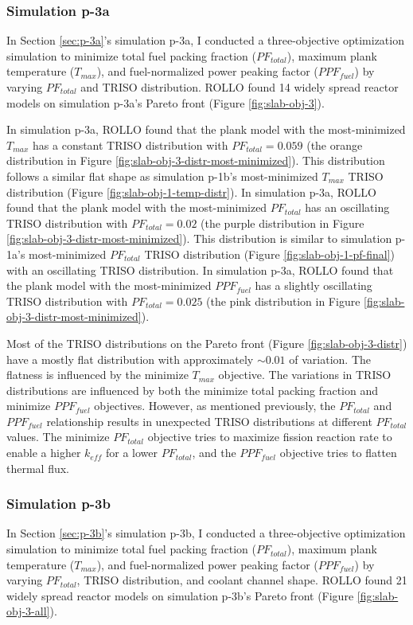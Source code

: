 \subsubsection{Simulation p-3a}
In Section \ref{sec:p-3a}'s simulation p-3a, I conducted a three-objective 
optimization simulation to minimize total fuel packing fraction ($PF_{total}$), 
maximum plank temperature ($T_{max}$), and fuel-normalized power peaking factor 
($PPF_{fuel}$) by varying $PF_{total}$ and TRISO distribution.
\gls{ROLLO} found 14 widely spread reactor models on simulation p-3a's Pareto 
front (Figure \ref{fig:slab-obj-3}). 

In simulation p-3a, \gls{ROLLO} found that the plank model with the most-minimized 
$T_{max}$ has a constant TRISO distribution with $PF_{total} = 0.059$
(the orange distribution in Figure \ref{fig:slab-obj-3-distr-most-minimized}). 
This distribution follows a similar flat shape as simulation p-1b's most-minimized 
$T_{max}$ TRISO distribution (Figure \ref{fig:slab-obj-1-temp-distr}).
In simulation p-3a, \gls{ROLLO} found that the plank model with the most-minimized 
$PF_{total}$ has an oscillating TRISO distribution with $PF_{total} = 0.02$
(the purple distribution in Figure \ref{fig:slab-obj-3-distr-most-minimized}). 
This distribution is similar to simulation p-1a's most-minimized $PF_{total}$ TRISO 
distribution (Figure \ref{fig:slab-obj-1-pf-final}) with an oscillating TRISO 
distribution.
In simulation p-3a, \gls{ROLLO} found that the plank model with the most-minimized 
$PPF_{fuel}$ has a slightly oscillating TRISO distribution with $PF_{total} = 0.025$ 
(the pink distribution in Figure \ref{fig:slab-obj-3-distr-most-minimized}). 

Most of the \gls{TRISO} distributions on the Pareto front (Figure 
\ref{fig:slab-obj-3-distr}) have a mostly flat distribution with approximately 
$\sim0.01$ of variation. 
The flatness is influenced by the minimize $T_{max}$ objective. 
The variations in \gls{TRISO} distributions are influenced by both the minimize 
total packing fraction and minimize $PPF_{fuel}$ objectives. 
However, as mentioned previously, the $PF_{total}$ and $PPF_{fuel}$ relationship
results in unexpected TRISO distributions at different $PF_{total}$ values. 
The minimize $PF_{total}$ objective tries to maximize fission reaction rate
to enable a higher $k_{eff}$ for a lower $PF_{total}$, and 
the $PPF_{fuel}$ objective tries to flatten thermal flux. 

\subsubsection{Simulation p-3b}
In Section \ref{sec:p-3b}'s simulation p-3b, I conducted a three-objective 
optimization simulation to minimize total fuel packing fraction ($PF_{total}$), 
maximum plank temperature ($T_{max}$), and fuel-normalized power peaking factor 
($PPF_{fuel}$) by varying $PF_{total}$, TRISO distribution, and coolant channel shape.
\gls{ROLLO} found 21 widely spread reactor models on simulation p-3b's Pareto 
front (Figure \ref{fig:slab-obj-3-all}). 

